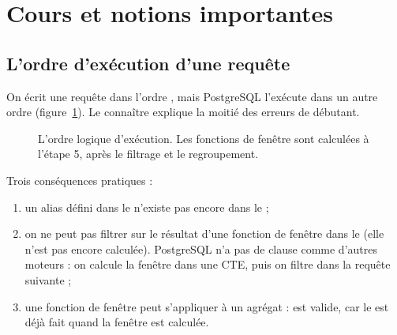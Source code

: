 \section{Cours et notions importantes}

\subsection{L'ordre d'exécution d'une requête}

On écrit une requête dans l'ordre , mais PostgreSQL l'exécute dans un
autre ordre (figure~\ref{fig:ordre}). Le connaître explique la moitié des erreurs de débutant.

\begin{figure}[ht]
\centering
{}
\caption{L'ordre logique d'exécution. Les fonctions de fenêtre sont calculées à l'étape 5, après le
filtrage et le regroupement.}
\label{fig:ordre}
\end{figure}

Trois conséquences pratiques :
\begin{enumerate}
\item un alias défini dans le  n'existe pas encore dans le  ;
\item on ne peut pas filtrer sur le résultat d'une fonction de fenêtre dans le  (elle n'est
pas encore calculée). PostgreSQL n'a pas de clause  comme d'autres moteurs : on calcule
la fenêtre dans une CTE, puis on filtre dans la requête suivante ;
\item une fonction de fenêtre peut s'appliquer à un agrégat :  est
valide, car le  est déjà fait quand la fenêtre est calculée.
\end{enumerate}

